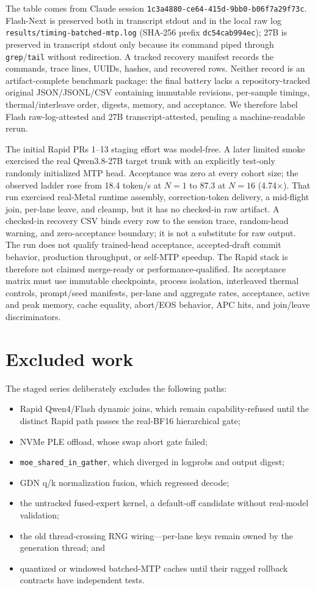 \documentclass[10pt,twocolumn]{article}
\begin{document}
The table comes from Claude session
\texttt{1c3a4880-ce64-415d-9bb0-b06f7a29f73c}.  Flash-Next is preserved both
in transcript stdout and in the local raw log
\texttt{results/timing-batched-mtp.log} (SHA-256 prefix
\texttt{dc54cab994ec}); 27B is preserved in transcript stdout only because its
command piped through \texttt{grep}/\texttt{tail} without redirection.  A
tracked recovery manifest records the commands, trace lines, UUIDs, hashes,
and recovered rows.  Neither record is an artifact-complete benchmark package:
the final battery lacks a repository-tracked original JSON/JSONL/CSV containing
immutable revisions, per-sample timings, thermal/interleave order, digests,
memory, and acceptance.  We therefore label Flash raw-log-attested and 27B
transcript-attested, pending a machine-readable rerun.

The initial Rapid PRs 1--13 staging effort was model-free.  A later limited
smoke exercised the real Qwen3.8-27B target trunk with an explicitly test-only
randomly initialized MTP head.  Acceptance was zero at every cohort size; the
observed ladder rose from 18.4 token/s at $N=1$ to 87.3 at $N=16$
(4.74$\times$).  That run exercised real-Metal runtime assembly, correction-token
delivery, a mid-flight join, per-lane leave, and cleanup, but it has no
checked-in raw artifact.  A checked-in recovery CSV binds every row to the
session trace, random-head warning, and zero-acceptance boundary; it is not a
substitute for raw output.  The run does not qualify trained-head acceptance,
accepted-draft commit behavior, production throughput, or self-MTP speedup.
The Rapid stack is therefore not claimed merge-ready or
performance-qualified.  Its acceptance matrix must use
immutable checkpoints, process isolation, interleaved thermal controls,
prompt/seed manifests, per-lane and aggregate rates, acceptance, active and
peak memory, cache equality, abort/EOS behavior, APC hits, and join/leave
discriminators.

\section{Excluded work}
The staged series deliberately excludes the following paths:
\begin{itemize}
  \item Rapid Qwen4/Flash dynamic joins, which remain capability-refused until
        the distinct Rapid path passes the real-BF16 hierarchical gate;
  \item NVMe PLE offload, whose swap abort gate failed;
  \item \texttt{moe\_shared\_in\_gather}, which diverged in logprobs and
        output digest;
  \item GDN q/k normalization fusion, which regressed decode;
  \item the untracked fused-expert kernel, a default-off candidate without
        real-model validation;
  \item the old thread-crossing RNG wiring---per-lane keys remain owned by the
        generation thread; and
  \item quantized or windowed batched-MTP caches until their ragged rollback
        contracts have independent tests.
\end{itemize}
\end{document}

